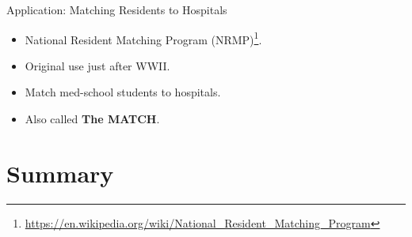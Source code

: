 \documentclass{beamer}
\begin{document}
\begin{frame}{Application: Matching Residents to Hospitals}
	\begin{itemize}
		\item National Resident Matching Program (NRMP)\footnote{\url{https://en.wikipedia.org/wiki/National_Resident_Matching_Program}}.
		\item Original use just after WWII.
		\item Match med-school students to hospitals.
		\item Also called \textbf{The MATCH}.
	\end{itemize}
\end{frame}




\section{Summary}
\begin{frame} 
	\tableofcontents[currentsection]
\end{frame}
\end{document}
